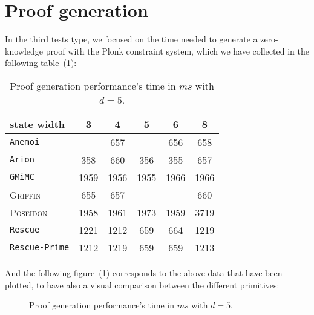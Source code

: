 \documentclass[12pt, a4paper]{report}
\begin{document}
\section{Proof generation}\label{sec:proofgen}

In the third tests type, we focused on the time needed to generate a zero-knowledge proof with the Plonk constraint system, which we have collected in the following table~(\ref{tab:proofgen}):

\begin{table}[H]
  \begin{center}
    \begin{tabular}{|l|c|c|c|c|c|}
      \hline
        state width & 3 & 4 & 5 & 6 & 8 \\
      \hline
        \texttt{Anemoi} & & 657 &  & 656 & 658 \\
        \texttt{Arion} & 358 & 660 & 356 & \cellcolor{green!35} 355 & 657 \\
        \texttt{GMiMC} & \cellcolor{orange!35} 1959 & \cellcolor{orange!35} 1956 & \cellcolor{orange!35} 1955 & \cellcolor{orange!35} 1966 & \cellcolor{orange!35} 1966 \\
        \textsc{Griffin} & 655 & 657 & & & 660 \\
        \textsc{Poseidon} & \cellcolor{orange!35} 1958 & \cellcolor{orange!35} 1961 & \cellcolor{orange!35} 1973 & \cellcolor{orange!35} 1959 & \cellcolor{red!35} 3719 \\
        \texttt{Rescue} & \cellcolor{orange!35} 1221 & \cellcolor{orange!35} 1212 & 659 & 664 & \cellcolor{orange!35} 1219 \\
        \texttt{Rescue-Prime} & \cellcolor{orange!35} 1212 & \cellcolor{orange!35} 1219 & 659 & 659 & \cellcolor{orange!35} 1213 \\
      \hline
    \end{tabular}
  \end{center}
  \caption{Proof generation performance's time in $ms$ with $d = 5$.}\label{tab:proofgen}
\end{table}

And the following figure~(\ref{plot:proofgen}) corresponds to the above data that have been plotted, to have also a visual comparison between the different primitives:

\begin{figure}[H]
  \hspace{60pt}
  \caption{Proof generation performance's time in $ms$ with $d = 5$.}\label{plot:proofgen}
\end{figure}
\end{document}
